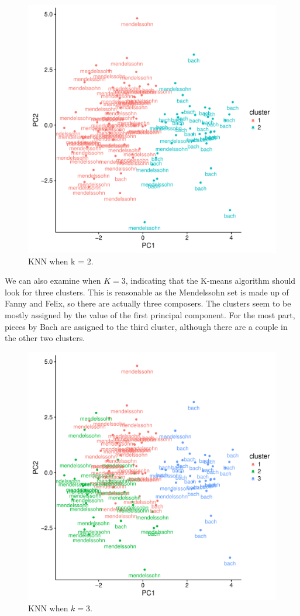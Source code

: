 \documentclass[12pt,twoside]{reedthesis}
\theoremstyle{definition}
\theoremstyle{definition}
\theoremstyle{definition}
\theoremstyle{remark}
\begin{document}
\begin{figure}[H]
\centering
\includegraphics[scale = .7]{images/kmeans_2_b.pdf}
\caption{KNN when k = 2.}
\label{subd}
\end{figure}
We can also examine when \(K=3\), indicating that the K-means algorithm
should look for three clusters. This is reasonable as the Mendelssohn
set is made up of Fanny and Felix, so there are actually three
composers. The clusters seem to be mostly assigned by the value of the
first principal component. For the most part, pieces by Bach are
assigned to the third cluster, although there are a couple in the other
two clusters.
\begin{figure}[H]
\centering
\includegraphics[scale = .7]{images/kmeans_3_b.pdf}
\caption{KNN when $k = 3$.}
\label{subd}
\end{figure}
\end{document}
